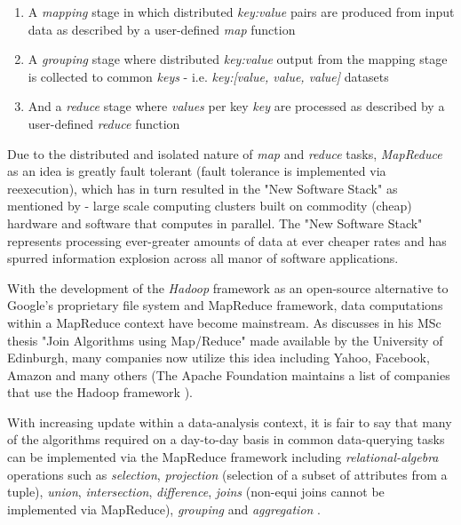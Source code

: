 \begin{enumerate}
    \item A \textit{mapping} stage in which distributed \textit{key:value} pairs are produced from input data as described by a user-defined \textit{map} function
    \item A \textit{grouping} stage where distributed \textit{key:value} output from the mapping stage is collected to common \textit{keys} - i.e. \textit{key:[value, value, value]} datasets
    \item And a \textit{reduce} stage where \textit{values} per key \textit{key} are processed as described by a user-defined \textit{reduce} function
\end{enumerate}

Due to the distributed and isolated nature of \textit{map} and \textit{reduce} tasks, \textit{MapReduce} as an idea is greatly fault tolerant (fault tolerance is implemented via reexecution), which has in turn resulted in the "New Software Stack" as mentioned by \cite{mining2011} - large scale computing clusters built on commodity (cheap) hardware and software that computes in parallel. The "New Software Stack" represents processing ever-greater amounts of data at ever cheaper rates and has spurred information explosion across all manor of software applications.

With the development of the \textit{Hadoop} framework as an open-source alternative to Google's proprietary file system and MapReduce framework, data computations within a MapReduce context have become mainstream. As \cite{chandar2010} discusses in his MSc thesis "Join Algorithms using Map/Reduce" made available by the University of Edinburgh, many companies now utilize this idea including Yahoo, Facebook, Amazon and many others (The Apache Foundation maintains a list of companies that use the Hadoop framework \cite{hadoopPower:2017}).

With increasing update within a data-analysis context, it is fair to say that many of the algorithms required on a day-to-day basis in common data-querying tasks can be implemented via the MapReduce framework including \textit{relational-algebra} operations such as \textit{selection}, \textit{projection} (selection of a subset of attributes from a tuple), \textit{union}, \textit{intersection}, \textit{difference}, \textit{joins} (non-equi joins cannot be implemented via MapReduce), \textit{grouping} and \textit{aggregation} \cite{mining2011}.


